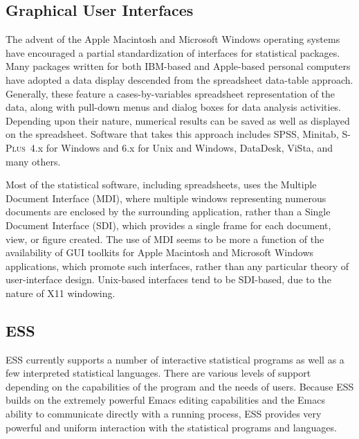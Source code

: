 \documentclass{article}
\newcommand*{\Splus}{\textsc{S-Plus}}
\begin{document}
\subsection{Graphical User Interfaces}
\label{sec:UI:GUI}

The advent of the Apple Macintosh and Microsoft Windows operating
systems have encouraged a partial standardization of interfaces for
statistical packages.  Many packages written for both IBM-based and
Apple-based personal computers have adopted a data display descended
from the spreadsheet data-table approach.  Generally, these feature a
cases-by-variables spreadsheet representation of the data, along with
pull-down menus and dialog boxes for data analysis activities.
Depending upon their nature, numerical results can be saved as well as
displayed on the spreadsheet.  Software that takes this approach
includes SPSS, Minitab, \Splus\ 4.x for Windows and 6.x for Unix and
Windows, DataDesk, ViSta, and many others.

Most of the statistical software, including spreadsheets, uses the
Multiple Document Interface (MDI), where multiple windows representing
numerous documents are enclosed by the surrounding application, rather
than a Single Document Interface (SDI), which provides a single frame
for each document, view, or figure created.  The use of MDI seems to
be more a function of the availability of GUI toolkits for Apple
Macintosh and Microsoft Windows applications, which promote such
interfaces, rather than any particular theory of user-interface
design.  Unix-based interfaces tend to be SDI-based, due to the nature
of X11 windowing.




\subsection{ESS}
\label{sec:UI:ESS}

ESS currently supports a number of interactive statistical programs as
well as a few interpreted statistical languages.  There are various
levels of support depending on the capabilities of the program and the
needs of users.  Because ESS builds on the extremely powerful Emacs
editing capabilities and the Emacs ability to communicate directly
with a running process, ESS provides very powerful and uniform
interaction with the statistical programs and languages.
\end{document}
